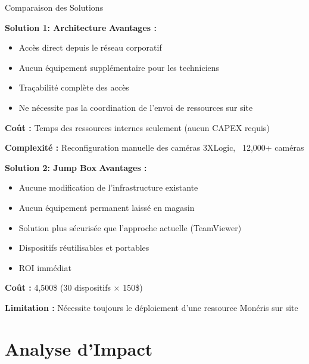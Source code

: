 \documentclass{dollarama}
\begin{document}
\begin{dollaramacomparison}{Comparaison des Solutions}

\textbf{Solution 1: Architecture}
\textbf{Avantages :}
\begin{itemize}
\item Accès direct depuis le réseau corporatif
\item Aucun équipement supplémentaire pour les techniciens
\item Traçabilité complète des accès
\item Ne nécessite pas la coordination de l'envoi de ressources sur site
\end{itemize}

\textbf{Coût :} Temps des ressources internes seulement (aucun CAPEX requis)

\textbf{Complexité :} Reconfiguration manuelle des caméras 3XLogic, ~12,000+ caméras

\vscompare

\textbf{Solution 2: Jump Box}
\textbf{Avantages :}
\begin{itemize}
\item Aucune modification de l'infrastructure existante
\item Aucun équipement permanent laissé en magasin
\item Solution plus sécurisée que l'approche actuelle (TeamViewer)
\item Dispositifs réutilisables et portables
\item ROI immédiat
\end{itemize}

\textbf{Coût :} 4,500\$ (30 dispositifs × 150\$)

\textbf{Limitation :} Nécessite toujours le déploiement d'une ressource Monéris sur site

\end{dollaramacomparison}


\section{Analyse d'Impact}
\end{document}
